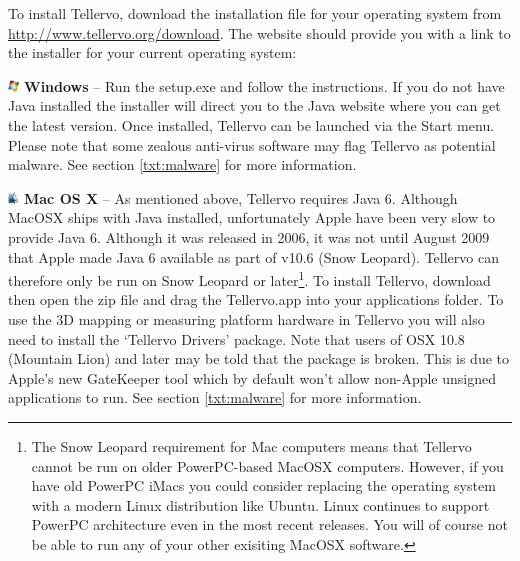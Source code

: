 To install Tellervo, download the installation file for your operating system from \url{http://www.tellervo.org/download}. The website should provide you with a link to the installer for your current operating system:

\begin{description}
\item \includegraphics[width=3mm]{Images/windows.png} \textbf{Windows} -- Run the setup.exe and follow the instructions. If you do not have Java installed the installer will direct you to the Java website where you can get the latest version. Once installed, Tellervo can be launched via the Start menu.  Please note that some zealous anti-virus software may flag Tellervo as potential malware.  See section \ref{txt:malware} for more information.

\item \includegraphics[width=3mm]{Images/mac.png} \textbf{Mac OS X} -- As mentioned above, Tellervo requires Java 6. Although MacOSX ships with Java installed, unfortunately Apple have been very slow to provide Java 6. Although it was released in 2006, it was not until August 2009 that Apple made Java 6 available as part of v10.6 (Snow Leopard). Tellervo can therefore only be run on Snow Leopard or later\footnote{The Snow Leopard requirement for Mac computers means that Tellervo cannot be run on older PowerPC-based MacOSX computers.  However, if you have old PowerPC iMacs you could consider replacing the operating system with a modern Linux distribution like Ubuntu.  Linux continues to support PowerPC architecture even in the most recent releases.  You will of course not be able to run any of your other exisiting MacOSX software.}. To install Tellervo, download then open the zip file and drag the Tellervo.app into your applications folder.  To use the 3D mapping or measuring platform hardware in Tellervo you will also need to install the `Tellervo Drivers' package.  Note that users of OSX 10.8 (Mountain Lion) and later may be told that the package is broken.  This is due to Apple's new GateKeeper tool which by default won't allow non-Apple unsigned applications to run.  See section \ref{txt:malware} for more information.   


\end{description}
